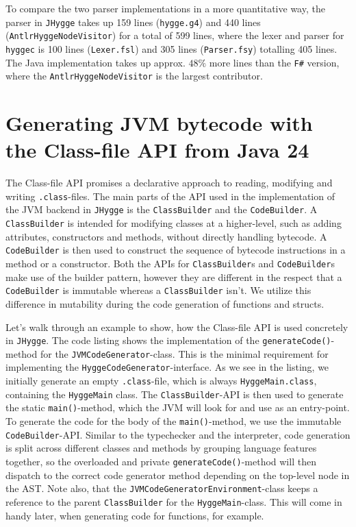 To compare the two parser implementations in a more quantitative way, the parser in \texttt{JHygge}
takes up 159 lines (\texttt{hygge.g4}) and 440 lines (\texttt{AntlrHyggeNodeVisitor}) for a total of 599 lines, where the lexer and
parser for \texttt{hyggec} is 100 lines (\texttt{Lexer.fsl}) and 305 lines (\texttt{Parser.fsy}) totalling 405 lines. The Java
implementation takes up approx. $48\%$ more lines than the \texttt{F\#} version, where the \texttt{AntlrHyggeNodeVisitor} is
the largest contributor.

\section{Generating JVM bytecode with the Class-file API from Java 24}

The Class-file API promises a declarative approach to reading, modifying and writing \texttt{.class}-files. The main parts of the
API used in the implementation of the JVM backend in \texttt{JHygge} is the \texttt{ClassBuilder} and the \texttt{CodeBuilder}.
A \texttt{ClassBuilder} is intended for modifying classes at a higher-level, such as adding attributes, constructors and methods,
without directly handling bytecode. A \texttt{CodeBuilder} is then used to construct the sequence of bytecode instructions in
a method or a constructor. Both the APIs for \texttt{ClassBuilder}s and \texttt{CodeBuilder}s make use of the builder pattern,
however they are different in the respect that a \texttt{CodeBuilder} is immutable whereas a \texttt{ClassBuilder} isn't.
We utilize this difference in mutability during the code generation of functions and structs.

Let's walk through an example to show, how the Class-file API is used concretely in \texttt{JHygge}. The code listing  shows
the implementation of the \texttt{generateCode()}-method for the \texttt{JVMCodeGenerator}-class. This is the minimal requirement
for implementing the \texttt{HyggeCodeGenerator}-interface. As we see in the listing, we initially generate an empty \texttt{.class}-file,
which is always \texttt{HyggeMain.class}, containing the \texttt{HyggeMain} class. The \texttt{ClassBuilder}-API is then used to
generate the static \texttt{main()}-method, which the JVM will look for and use as an entry-point. To generate the code for
the body of the \texttt{main()}-method, we use the immutable \texttt{CodeBuilder}-API. Similar to the typechecker and the interpreter,
code generation is split across different classes and methods by grouping language features together, so the overloaded and private
\texttt{generateCode()}-method will then dispatch to the correct code generator method depending on the top-level node in the AST.
Note also, that the \texttt{JVMCodeGeneratorEnvironment}-class keeps a reference to the parent \texttt{ClassBuilder} for the
\texttt{HyggeMain}-class. This will come in handy later, when generating code for functions, for example.

